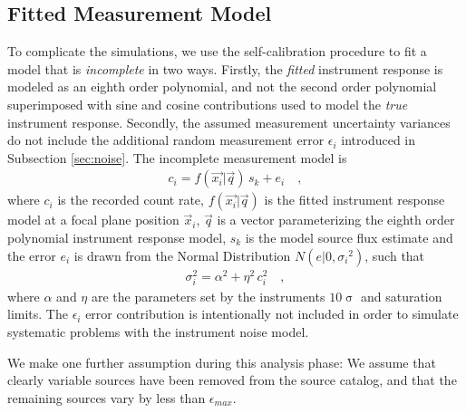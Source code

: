 \documentclass[manuscript]{aastex}
\begin{document}
\subsection{Fitted Measurement Model}
To complicate the simulations, we use the self-calibration procedure to fit a model that is \textit{incomplete} in two ways. Firstly, the \textit{fitted} instrument response is modeled as an eighth order polynomial, and not the second order polynomial superimposed with sine and cosine contributions used to model the \textit{true} instrument response. Secondly, the assumed measurement uncertainty variances do not include the additional random measurement error $\epsilon_{i}$ introduced in Subsection \ref{sec:noise}. The incomplete measurement model is
\begin{eqnarray*}
c_i = f(\vec{x_i} | \vec{q}) \, s_{k} + e_{i} \quad ,
\end{eqnarray*}
where $c_i$ is the recorded count rate, $f(\vec{x_i} | \vec{q})$ is the fitted instrument response model at a focal plane position $\vec{x}_i$, $\vec{q}$ is a vector parameterizing the eighth order polynomial instrument response model, $s_k$ is the model source flux estimate and the error $e_i$ is drawn from the Normal Distribution $N(e|0,{\sigma_i}^2)$, such that
\begin{eqnarray*}
\sigma_{{i}}^{2} = \alpha^{2} + \eta^{2}\, c^{2}_i \quad ,
\end{eqnarray*} 
where $\alpha$ and $\eta$ are the parameters set by the instruments $10\upsigma$ and saturation limits. The $\epsilon_i$ error contribution is intentionally not included in order to simulate systematic problems with the instrument noise model. 

We make one further assumption during this analysis phase: We assume that clearly variable sources have been removed from the source catalog, and that the remaining sources vary by less than $\epsilon_{max}$.
\end{document}
